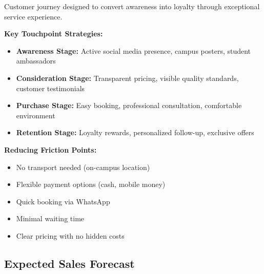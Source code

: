 \documentclass[a4paper,12pt]{article}
\begin{document}
\begin{center}

\vspace{0.5em}
Customer journey designed to convert awareness into loyalty through exceptional service experience.
\end{center}

\vspace{1em}

\begin{tcolorbox}[mybox, title=\textbf{Customer Journey Optimization}]
\textbf{Key Touchpoint Strategies:}
\begin{itemize}[leftmargin=1em, itemsep=0pt]
    \item \textbf{Awareness Stage:} Active social media presence, campus posters, student ambassadors
    \item \textbf{Consideration Stage:} Transparent pricing, visible quality standards, customer testimonials
    \item \textbf{Purchase Stage:} Easy booking, professional consultation, comfortable environment
    \item \textbf{Retention Stage:} Loyalty rewards, personalized follow-up, exclusive offers
\end{itemize}

\textbf{Reducing Friction Points:}
\begin{itemize}[leftmargin=1em, itemsep=0pt]
    \item No transport needed (on-campus location)
    \item Flexible payment options (cash, mobile money)
    \item Quick booking via WhatsApp
    \item Minimal waiting time
    \item Clear pricing with no hidden costs
\end{itemize}
\end{tcolorbox}

\subsection{Expected Sales Forecast}
\end{document}

